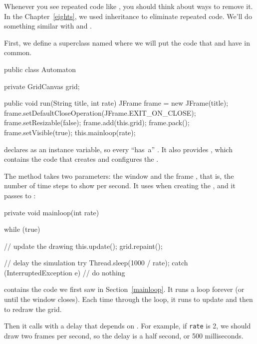 Whenever you see repeated code like , you should think about ways to remove it.
In the Chapter~\ref{eights}, we used inheritance to eliminate repeated code.
We'll do something similar with  and .

First, we define a superclass named  where we will put the code that  and  have in common.

\begin{code}
public class Automaton {
    private GridCanvas grid;

    public void run(String title, int rate) {
        JFrame frame = new JFrame(title);
        frame.setDefaultCloseOperation(JFrame.EXIT_ON_CLOSE);
        frame.setResizable(false);
        frame.add(this.grid);
        frame.pack();
        frame.setVisible(true);
        this.mainloop(rate);
    }
}
\end{code}

 declares  as an instance variable, so every  ``has~a'' .
It also provides , which contains the code that creates and configures the .

The  method takes two parameters: the window  and the frame , that is, the number of time steps to show per second.
It uses  when creating the , and it passes  to :

\begin{code}
private void mainloop(int rate) {
    while (true) {

        // update the drawing
        this.update();
        grid.repaint();

        // delay the simulation
        try {
            Thread.sleep(1000 / rate);
        } catch (InterruptedException e) {
            // do nothing
        }
    }
}
\end{code}

 contains the code we first saw in Section~\ref{mainloop}.
It runs a  loop forever (or until the window closes).
Each time through the loop, it runs  to update  and then  to redraw the grid.

Then it calls  with a delay that depends on .
For example, if {\tt rate} is 2, we should draw two frames per second, so the delay is a half second, or 500 milliseconds.


